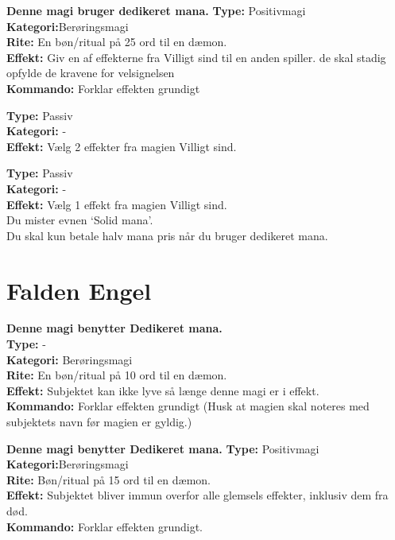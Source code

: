 \begin{korruption*}
\textbf{Denne magi bruger dedikeret mana.}
\textbf{Type:} Positivmagi\\
\textbf{Kategori:}Berøringsmagi\\
\textbf{Rite:} En bøn/ritual på 25 ord til en dæmon.\\
\textbf{Effekt:} Giv en af effekterne fra Villigt sind til en anden spiller. de skal stadig opfylde de kravene for velsignelsen\\
\textbf{Kommando:} Forklar effekten grundigt
\end{korruption*}

\begin{korruption*}
\textbf{Type:} Passiv\\
\textbf{Kategori:} -\\
\textbf{Effekt:} Vælg 2 effekter fra magien Villigt sind.
\end{korruption*}

\begin{korruption*}
\textbf{Type:} Passiv\\
\textbf{Kategori:} -\\
\textbf{Effekt:} Vælg 1 effekt fra magien Villigt sind.\\
Du mister evnen ‘Solid mana’.\\ 
Du skal kun betale halv mana pris når du bruger dedikeret mana.
\end{korruption*}

\section{Falden Engel}

\begin{falden*}
\textbf{Denne magi benytter Dedikeret mana.}\\
\textbf{Type:} - \\
\textbf{Kategori:} Berøringsmagi\\
\textbf{Rite:} En bøn/ritual på 10 ord til en dæmon.\\
\textbf{Effekt:} Subjektet kan ikke lyve så længe denne magi er i effekt.\\
\textbf{Kommando:} Forklar effekten grundigt (Husk at magien skal noteres med subjektets navn før magien er gyldig.)
\end{falden*}

\begin{falden*}
\textbf{Denne magi benytter Dedikeret mana.}
\textbf{Type:} Positivmagi\\
\textbf{Kategori:}Berøringsmagi\\
\textbf{Rite:} Bøn/ritual på 15 ord til en dæmon.\\
\textbf{Effekt:} Subjektet bliver immun overfor alle glemsels effekter, inklusiv dem fra død.\\
\textbf{Kommando:} Forklar effekten grundigt.
\end{falden*}

